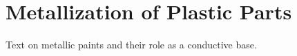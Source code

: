 \section{Metallization of Plastic Parts}
Text on metallic paints and their role as a conductive base.
